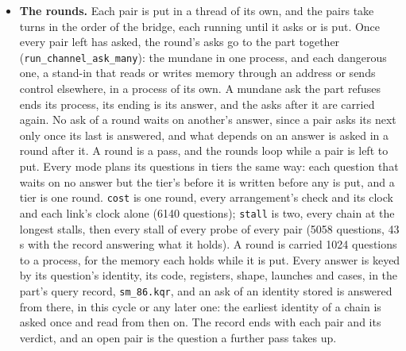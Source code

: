 \begin{itemize}
\item \textbf{The rounds.} Each pair is put in a thread of its own, and the pairs take turns in the order of the bridge, each running until it asks or is put. Once every pair left has asked, the round's asks go to the part together (\texttt{run\_\allowbreak{}channel\_\allowbreak{}ask\_\allowbreak{}many}): the mundane in one process, and each dangerous one, a stand-in that reads or writes memory through an address or sends control elsewhere, in a process of its own. A mundane ask the part refuses ends its process, its ending is its answer, and the asks after it are carried again. No ask of a round waits on another's answer, since a pair asks its next only once its last is answered, and what depends on an answer is asked in a round after it. A round is a pass, and the rounds loop while a pair is left to put. Every mode plans its questions in tiers the same way: each question that waits on no answer but the tier's before it is written before any is put, and a tier is one round. \texttt{cost} is one round, every arrangement's check and its clock and each link's clock alone (6140 questions); \texttt{stall} is two, every chain at the longest stalls, then every stall of every probe of every pair (5058 questions, 43 s with the record answering what it holds). A round is carried 1024 questions to a process, for the memory each holds while it is put. Every answer is keyed by its question's identity, its code, registers, shape, launches and cases, in the part's query record, \texttt{sm\_\allowbreak{}86.\allowbreak{}kqr}, and an ask of an identity stored is answered from there, in this cycle or any later one: the earliest identity of a chain is asked once and read from then on. The record ends with each pair and its verdict, and an open pair is the question a further pass takes up.

\end{itemize}
